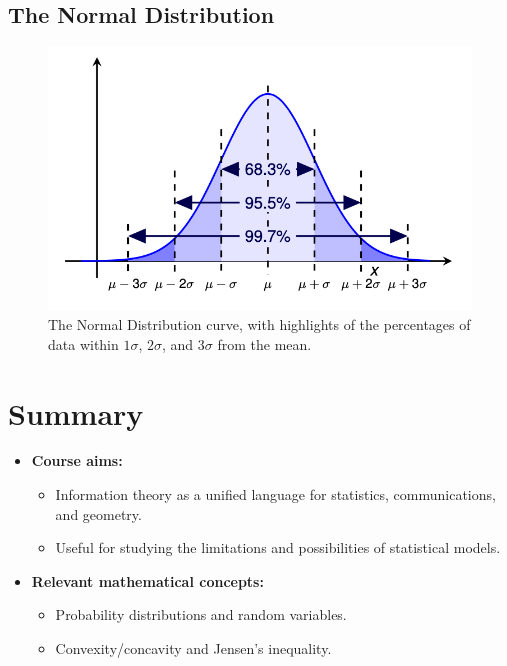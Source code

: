\newpage
\subsection{The Normal Distribution}

\begin{figure}[h]
    \centering
    \includegraphics[width=0.6\linewidth]{img/normal_dist.png}
    \caption{The Normal Distribution curve, with highlights of the percentages of data within \(1\sigma\), \(2\sigma\), and \(3\sigma\) from the mean.}
\end{figure}


\section{Summary}

\begin{itemize}
    \item \textbf{Course aims:}
    \begin{itemize}
        \item Information theory as a unified language for statistics, communications, and geometry.
        \item Useful for studying the limitations and possibilities of statistical models.
    \end{itemize}

    \item \textbf{Relevant mathematical concepts:}
    \begin{itemize}
        \item Probability distributions and random variables.
        \item Convexity/concavity and Jensen's inequality.
    \end{itemize}
\end{itemize}
